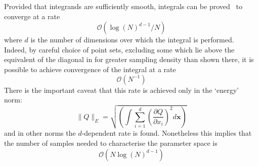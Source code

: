 Provided that integrands are sufficiently smooth,
integrals can be proved~\cite{Bu04Spar} to converge at a rate
\begin{equation}\label{eq:sparsec}
\mathcal{O}(\log(N)^{d-1}/N)
\end{equation}
where $d$ is the number of dimensions over which the integral is performed.
Indeed, by careful choice of point sets, excluding some which
lie above the equivalent of the diagonal in  for
greater sampling density than shown there,
it is possible to achieve convergence of the integral at a rate
\begin{equation}\label{eq:sparsen}
\mathcal{O}(N^{-1})
\end{equation}
There is the important caveat that this rate is achieved only in
the `energy' norm:
\begin{equation}\label{eq:ennorm}
\parallel Q \parallel_E = \sqrt{\left(\int \sum_{i=1}^d \left(\frac{\partial Q}{\partial x_i}\right)^2 d{\mathbf x}\right)}
\end{equation}
and in other norms the $d$-dependent rate  is found. Nonetheless
this implies that the number of samples needed to characterise the
parameter space is
\begin{equation}\label{eq:nsparsec}
\mathcal{O}(N \log(N)^{d-1})
\end{equation}

